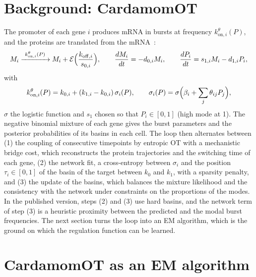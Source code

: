 \documentclass[a4paper, 11pt]{article}
\newcommand{\koni}{k_{\mathrm{on},i}^{\theta}}
\theoremstyle{plain}
\theoremstyle{remark}
\begin{document}
\section{Background: CardamomOT}\label{sec:background}

The promoter of each gene $i$ produces mRNA in bursts at frequency $\koni(P)$, and the proteins are translated from the mRNA~\cite{herbachinferring2017}:
\begin{equation}\label{eq:pdmp}
M_i \xrightarrow{\ \koni(P)\ } M_i + \mathcal{E}\Bigl(\frac{k_{\mathrm{off},i}}{s_{0,i}}\Bigr), \qquad
\frac{dM_i}{dt} = -d_{0,i}M_i, \qquad \frac{dP_i}{dt} = s_{1,i}M_i - d_{1,i}P_i,
\end{equation}
with
\begin{equation}\label{eq:kon}
\koni(P) = k_{0,i} + (k_{1,i} - k_{0,i})\,\sigma_i(P), \qquad \sigma_i(P) = \sigma\Bigl(\beta_i + \sum_j \theta_{ij}P_j\Bigr),
\end{equation}
$\sigma$ the logistic function and $s_1$ chosen so that $P_i \in [0,1]$ (high mode at 1). The negative binomial mixture of each gene gives the burst parameters and the posterior probabilities of its basins in each cell. The loop then alternates between (1) the coupling of consecutive timepoints by entropic OT with a mechanistic bridge cost, which reconstructs the protein trajectories and the switching time of each gene, (2) the network fit, a cross-entropy between $\sigma_i$ and the position $\tau_i \in [0,1]$ of the basin of the target between $k_0$ and $k_1$, with a sparsity penalty, and (3) the update of the basins, which balances the mixture likelihood and the consistency with the network under constraints on the proportions of the modes. In the published version, steps (2) and (3) use hard basins, and the network term of step (3) is a heuristic proximity between the predicted and the modal burst frequencies. The next section turns the loop into an EM algorithm, which is the ground on which the regulation function can be learned.

\section{CardamomOT as an EM algorithm}\label{sec:em}
\end{document}
